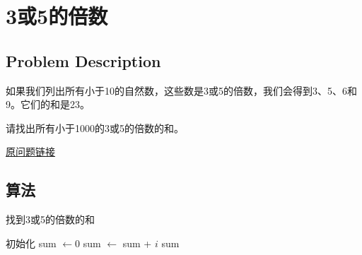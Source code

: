 \section{3或5的倍数}
\subsection{Problem Description}
\begin{tcolorbox}
	如果我们列出所有小于10的自然数，这些数是3或5的倍数，我们会得到3、5、6和9。它们的和是23。

	请找出所有小于1000的3或5的倍数的和。

	\href{https://projecteuler.net/problem=1}{原问题链接}
\end{tcolorbox}

\subsection{算法}
\begin{algorithm}
	\caption{找到3或5的倍数的和}
	\begin{algorithmic}
		\State 初始化 sum $\gets 0$
		\State sum $\gets$ sum + $i$
		\EndIf
		\EndFor
		\Return sum
	\end{algorithmic}
\end{algorithm}
